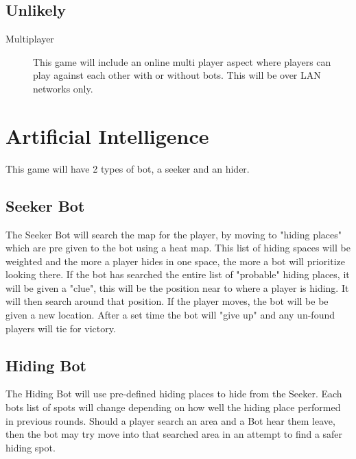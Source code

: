 \documentclass[]{report}
\begin{document}
\subsection{Unlikely}
\begin{description}
	\item[Multiplayer] This game will include an online multi player aspect where players can play against each other with or without bots. This will be over LAN networks only.
\end{description}

\section{Artificial Intelligence}
This game will have 2 types of bot, a seeker and an hider.
\subsection{Seeker Bot}
The Seeker Bot will search the map for the player, by moving to "hiding places" which are pre given to the bot using a heat map. This list of hiding spaces will be weighted and the more a player hides in one space, the more a bot will prioritize looking there. If the bot has searched the entire list of "probable" hiding places, it will be given a "clue", this will be the position near to where a player is hiding. It will then search around that position. If the player moves, the bot will be be given a new location. After a set time the bot will "give up" and any un-found players will tie for victory.

\subsection{Hiding Bot}
The Hiding Bot will use pre-defined hiding places to hide from the Seeker. Each bots list of spots will change depending on how well the hiding place performed in previous rounds. Should a player search an area and a Bot hear them leave, then the bot may try move into that searched area in an attempt to find a safer hiding spot.
\end{document}
